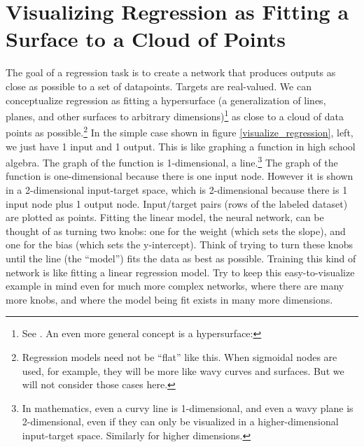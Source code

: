 \section{Visualizing Regression as Fitting a Surface to a Cloud of Points}
\label{visRegression}

The goal of a regression task is to create a network that produces outputs as close as possible to a set of datapoints. Targets are real-valued. We can conceptualize regression as fitting a hypersurface (a generalization of lines, planes, and other surfaces to arbitrary dimensions)\footnote{See . An even more general concept is a hypersurface: } as close to a cloud of data points as possible.\footnote{Regression models need not be ``flat'' like this. When sigmoidal nodes are used, for example, they will be more like wavy curves and surfaces. But we will not consider those cases here.} In the simple case shown in figure \ref{visualize_regression}, left,  we just have 1 input and 1 output. This is like graphing a function in high school algebra. The graph of the function is 1-dimensional, \ie a line.\footnote{In mathematics, even a curvy line is 1-dimensional, and even a wavy plane is 2-dimensional, even if they can only be visualized in a higher-dimensional input-target space. Similarly for higher dimensions.} The graph of the function is one-dimensional because there is one input node. However it is shown in a 2-dimensional  input-target space, which is 2-dimensional because there is 1 input node plus 1 output  node. Input/target pairs (\ie rows of the labeled dataset) are plotted as points. Fitting the linear model, the neural network, can be thought of as turning two knobs: one for the weight (which sets the slope), and one for the bias (which sets the y-intercept). Think of trying to turn these knobs until the line (the ``model'') fits the data as best as possible. Training this kind of network is like fitting a linear regression model. Try to keep this easy-to-visualize example in mind even for much more complex networks, where there are many more knobs, and where the model being fit exists in many more dimensions.

